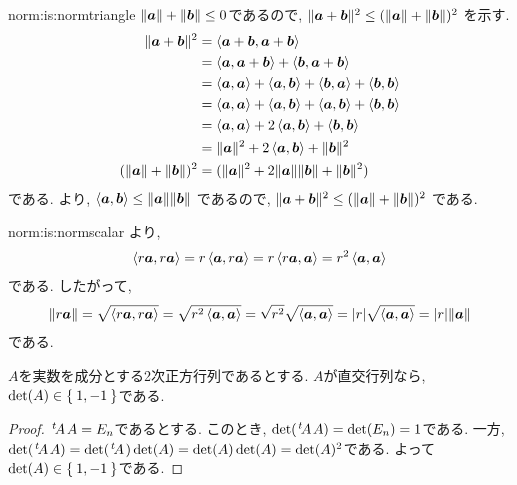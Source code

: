 \begin{proofof*}{norm:is:norm}{triangle}
  $\|\aaa\|+\|\bbb\|\leq 0$であるので,
  $\|\aaa+\bbb\|^2 \leq (\|\aaa\|+\|\bbb\|)^2$
  を示す.
  \begin{align*}
    \|\aaa+\bbb\|^2
    &=\Braket{\aaa+\bbb,\aaa+\bbb}\\
    &=\Braket{\aaa,\aaa+\bbb}+\Braket{\bbb,\aaa+\bbb}\\
    &=\Braket{\aaa,\aaa}+\Braket{\aaa,\bbb}+\Braket{\bbb,\aaa}+\Braket{\bbb,\bbb}\\
    &=\Braket{\aaa,\aaa}+\Braket{\aaa,\bbb}+\Braket{\aaa,\bbb}+\Braket{\bbb,\bbb}\\
    &=\Braket{\aaa,\aaa}+2\Braket{\aaa,\bbb}+\Braket{\bbb,\bbb}\\
    &=\|\aaa\|^2+2\Braket{\aaa,\bbb}+\|\bbb\|^2\\
    (\|\aaa\|+\|\bbb\|)^2
    &=(\|\aaa\|^2+2\|\aaa\|\|\bbb\|+\|\bbb\|^2)\\
  \end{align*}
  である.
  より,
  $\Braket{\aaa,\bbb}\leq \|\aaa\|\|\bbb\| $
  であるので,
  $\|\aaa+\bbb\|^2 \leq (\|\aaa\|+\|\bbb\|)^2$
  である.
\end{proofof*}


\begin{proofof*}{norm:is:norm}{scalar}
  より,
  \begin{align*}
    \Braket{r\aaa,r\aaa}=r\Braket{\aaa,r\aaa}=r\Braket{r\aaa,\aaa}=r^2\Braket{\aaa,\aaa}
  \end{align*}
  である. したがって, 
  \begin{align*}
    \|r\aaa\|=\sqrt{\Braket{r\aaa,r\aaa}}=\sqrt{r^2\Braket{\aaa,\aaa}}
    =\sqrt{r^2}\sqrt{\Braket{\aaa,\aaa}}
    =|r|\sqrt{\Braket{\aaa,\aaa}}
    =|r|\|\aaa\|
  \end{align*}
  である.
\end{proofof*}

\begin{lemma}
  \label{lem:ortho:det}
  $A$を実数を成分とする2次正方行列であるとする.
  $A$が直交行列なら, $\det(A)\in \Set{1,-1}$である.
\end{lemma}
\begin{proof}
  $\transposed{A}A=E_n$であるとする.
  このとき, $\det(\transposed{A}A)=\det(E_n)=1$である.
  一方,  $\det(\transposed{A}A)=\det(\transposed{A})\det(A)=\det(A)\det(A)=\det(A)^2$である. よって$\det(A)\in\Set{1,-1}$である.
\end{proof}

